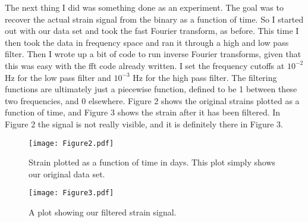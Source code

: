 \documentclass{article}
\begin{document}
The next thing I did was something done as an experiment. The goal was to recover the actual strain signal from the binary as a function of time. So I started out with our data set and took the fast Fourier transform, as before. This time I then took the data in frequency space and ran it through a high and low pass filter. Then I wrote up a bit of code to run inverse Fourier transforms, given that this was easy with the fft code already written. I set the frequency cutoffs at $10^{-2}$ Hz for the low pass filter and $10^{-3}$ Hz for the high pass filter. The filtering functions are ultimately just a piecewise function, defined to be 1 between these two frequencies, and 0 elsewhere. Figure 2 shows the original strains plotted as a function of time, and Figure 3 shows the strain after it has been filtered. In Figure 2 the signal is not really visible, and it is definitely there in Figure 3.\\



\begin{figure}[H]\label{fft}
  \begin{center}
  \texttt{[image: Figure2.pdf]}
  \caption{Strain plotted as a function of time in days. This plot simply shows our original data set.}
  \end{center}
\end{figure}



\begin{figure}[H]\label{f1}
  \begin{center}
  \texttt{[image: Figure3.pdf]}
  \caption{A plot showing our filtered strain signal.}
  \end{center}
\end{figure}
\end{document}
